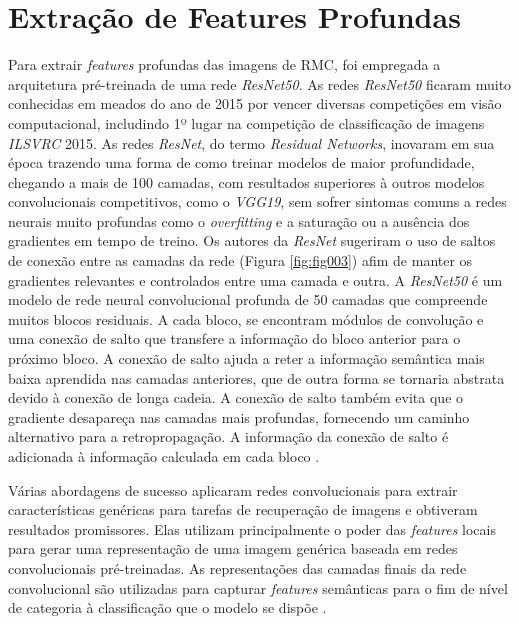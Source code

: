 \section{Extração de Features Profundas}
Para extrair \textit{features} profundas das imagens de \gls{RMC}, foi empregada a arquitetura pré-treinada de uma rede \textit{ResNet50}. As redes \textit{ResNet50} ficaram muito conhecidas em meados do ano de 2015 por vencer diversas competições em visão computacional, includindo 1º lugar na competição de classificação de imagens \textit{ILSVRC} 2015. As redes \textit{ResNet}, do termo \textit{Residual Networks}, inovaram em sua época trazendo uma forma  de como treinar modelos de maior profundidade, chegando a mais de 100 camadas, com resultados superiores à outros modelos convolucionais competitivos, como o \textit{VGG19}, sem sofrer sintomas comuns a redes neurais muito profundas como o \textit{overfitting} e a saturação ou a ausência dos gradientes em tempo de treino. Os autores da \textit{ResNet} sugeriram o uso de saltos de conexão entre as camadas da rede (Figura \ref{fig:fig003}) afim de manter os gradientes relevantes e controlados entre uma camada e outra.  A \textit{ResNet50} é um modelo de rede neural convolucional profunda de 50 camadas que compreende muitos blocos residuais. A cada bloco, se encontram módulos de convolução e uma conexão de salto que transfere a informação do bloco anterior para o próximo bloco. A conexão de salto ajuda a reter a informação semântica mais baixa aprendida nas camadas anteriores, que de outra forma se tornaria abstrata devido à conexão de longa cadeia. A conexão de salto também evita que o gradiente desapareça nas camadas mais profundas, fornecendo um caminho alternativo para a retropropagação. A informação da conexão de salto é adicionada à informação calculada em cada bloco \cite{heDeepResidualLearning2015}.

Várias abordagens de sucesso aplicaram redes convolucionais para extrair características genéricas para tarefas de recuperação de imagens e obtiveram resultados promissores. Elas utilizam principalmente o poder das \textit{features} locais para gerar uma representação de uma imagem genérica baseada em redes convolucionais pré-treinadas. As representações das camadas finais da rede convolucional são utilizadas para capturar \textit{features} semânticas para o fim de nível de categoria à classificação que o modelo se dispõe \cite{alzubiContentbasedImageRetrieval2017b}.

